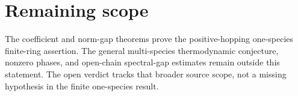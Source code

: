 \documentclass{article}
\begin{document}
\section{Remaining scope}
The coefficient and norm-gap theorems prove the positive-hopping
one-species finite-ring assertion. The general
multi-species thermodynamic conjecture, nonzero phases, and open-chain
spectral-gap estimates remain outside this statement. The open verdict
tracks that broader source scope, not a missing hypothesis in the finite
one-species result.
\end{document}
